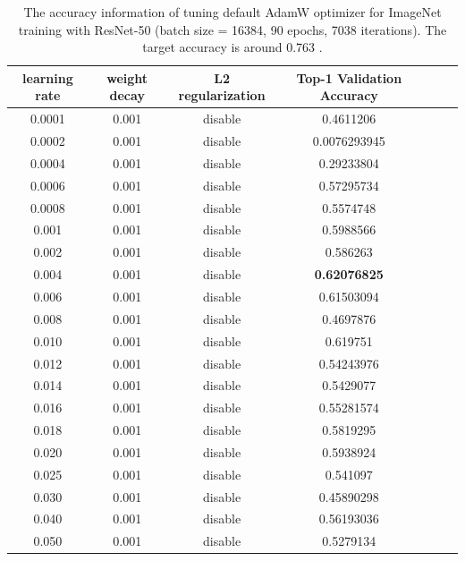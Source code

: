 \begin{table}[ht]
\renewcommand{\arraystretch}{1.3}
\caption{The accuracy information of tuning default AdamW optimizer for ImageNet training with ResNet-50 (batch size = 16384, 90 epochs, 7038 iterations). The target accuracy is around 0.763 \citep{goyal2017accurate}.}
\centering
\begin{tabular}{|c|c|c|c|c|c|c|}
\hline
learning rate & weight decay & L2 regularization & Top-1 Validation Accuracy\\
\hline
\hline
0.0001 & 0.001 & disable & 0.4611206 \\
\hline
0.0002 & 0.001 & disable & 0.0076293945 \\
\hline
0.0004 & 0.001 & disable & 0.29233804 \\
\hline
0.0006 & 0.001 & disable & 0.57295734 \\
\hline
0.0008 & 0.001 & disable & 0.5574748 \\
\hline
0.001 & 0.001 & disable & 0.5988566 \\
\hline
0.002 & 0.001 & disable & 0.586263 \\
\hline
0.004 & 0.001 & disable & {\bf 0.62076825} \\
\hline
0.006 & 0.001 & disable & 0.61503094 \\
\hline
0.008 & 0.001 & disable & 0.4697876 \\
\hline
0.010 & 0.001 & disable & 0.619751 \\
\hline
0.012 & 0.001 & disable & 0.54243976 \\
\hline
0.014 & 0.001 & disable & 0.5429077 \\
\hline
0.016 & 0.001 & disable & 0.55281574 \\
\hline
0.018 & 0.001 & disable & 0.5819295 \\
\hline
0.020 & 0.001 & disable & 0.5938924 \\
\hline
0.025 & 0.001 & disable & 0.541097 \\
\hline
0.030 & 0.001 & disable & 0.45890298 \\
\hline
0.040 & 0.001 & disable & 0.56193036 \\
\hline
0.050 & 0.001 & disable & 0.5279134 \\
\hline
\end{tabular}
\label{table:imagenet_adamw_default_3}
\end{table}


